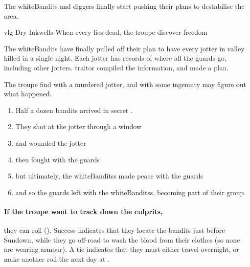 \label{risingTitles}

The \gls{whiteBandits} and \glspl{digger} finally start pushing their plans to destabilise the area.

{\gls{vlg} Dry Inkwells}%
{When every  lies dead, the troupe discover freedom}%

\begin{exampletext}
  The \gls{whiteBandits} have finally pulled off their plan to have every \gls{jotter} in \gls{valley} killed in a single night.
  Each \gls{jotter} has records of where all the \glspl{guard} go, including other \glspl{jotter}.
  \Gls{traitor} compiled the information, and made a plan.
\end{exampletext}

The troupe find  with a murdered \gls{jotter}, and with some ingenuity may figure out what happened.


\begin{enumerate}
  \item
  Half a dozen bandits arrived in secret
  .
  \item
  They shot at the \gls{jotter} through a window
  \item
  and wounded the \gls{jotter}
  \item
  then fought with the \glspl{guard}
  \item
  but ultimately, the \glspl{whiteBandits} made peace with the \glspl{guard}
  \item
  and so the \glspl{guard} left with the \glspl{whiteBandits}, becoming part of their group.
\end{enumerate}

\paragraph{If the troupe want to track down the culprits,}
they can roll  (\tn[8]).
Success indicates that they locate the bandits just before Sundown, while they go off-road to wash the blood from their clothes (so none are wearing armour).
A tie indicates that they must either travel overnight, or make another roll the next day at \tn[10].

